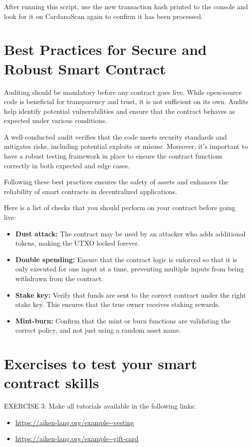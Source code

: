 After running this script, use the new transaction hash printed to the console and look for it on CardanoScan again to confirm it has been processed.


\section{Best Practices for Secure and Robust Smart Contract}

Auditing should be mandatory before any contract goes live. While open-source code is beneficial for transparency and trust, it is not sufficient on its own. Audits help identify potential vulnerabilities and ensure that the contract behaves as expected under various conditions.

A well-conducted audit verifies that the code meets security standards and mitigates risks, including potential exploits or misuse. Moreover, it's important to have a robust testing framework in place to ensure the contract functions correctly in both expected and edge cases.

Following these best practices ensures the safety of assets and enhances the reliability of smart contracts in decentralized applications.

Here is a list of checks that you should perform on your contract before going live:

\begin{itemize}
  \item \textbf{Dust attack:} The contract may be used by an attacker who adds additional tokens, making the UTXO locked forever.
  \item \textbf{Double spending:} Ensure that the contract logic is enforced so that it is only executed for one input at a time, preventing multiple inputs from being withdrawn from the contract.
  \item \textbf{Stake key:} Verify that funds are sent to the correct contract under the right stake key. This ensures that the true owner receives staking rewards.
  \item \textbf{Mint-burn:} Confirm that the mint or burn functions are validating the correct policy, and not just using a random asset name.
\end{itemize}

\section{Exercises to test your smart contract skills}
\begin{remark}
  EXERCISE 3: Make all tutorials available in the following links:
  \begin{itemize}
    \item \url{https://aiken-lang.org/example--vesting}
    \item \url{https://aiken-lang.org/example--gift-card}
  \end{itemize}
\end{remark}

